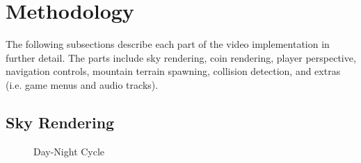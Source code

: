 \documentclass{article}
\begin{document}
\section{Methodology}
The following subsections describe each part of the video implementation in further detail.  The parts include sky rendering, coin rendering, player perspective, navigation controls, mountain terrain spawning, collision detection, and extras (i.e. game menus and audio tracks).
\subsection{Sky Rendering}
\begin{figure}[H]
\begin{center}
\caption{Day-Night Cycle}
\end{center}
\end{figure}
\end{document}
